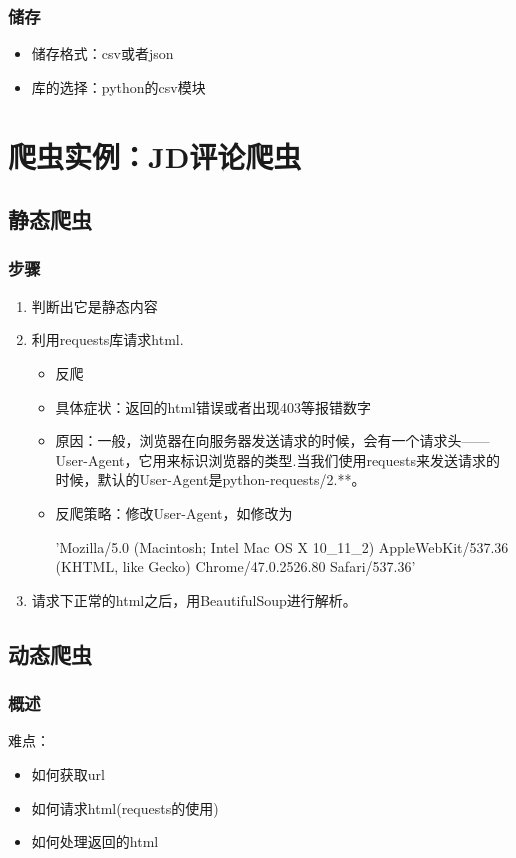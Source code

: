 \documentclass{beamer}
\begin{document}
\begin{frame}
\frametitle{储存}
\begin{itemize}
   \item 储存格式：csv或者json
   \item 库的选择：python的csv模块
\end{itemize}
\end{frame}

\section{爬虫实例：JD评论爬虫}

\subsection{静态爬虫}
\begin{frame}
\frametitle{步骤}
\begin{enumerate}
  \item 判断出它是静态内容
  \item 利用requests库请求html.
  \begin{itemize}
  	\item 反爬
  	\item 具体症状：返回的html错误或者出现403等报错数字
  	\item 原因：一般，浏览器在向服务器发送请求的时候，会有一个请求头——User-Agent，它用来标识浏览器的类型.当我们使用requests来发送请求的时候，默认的User-Agent是python-requests/2.**。
    \item 反爬策略：修改User-Agent，如修改为
    \begin{listings}
    'Mozilla/5.0 (Macintosh; Intel Mac OS X 10\_11\_2) AppleWebKit/537.36 (KHTML, like Gecko) Chrome/47.0.2526.80 Safari/537.36'
    \end{listings}
  \end{itemize}
  \item 请求下正常的html之后，用BeautifulSoup进行解析。
\end{enumerate}
\end{frame}

\subsection{动态爬虫}
\begin{frame}
\frametitle{概述}
难点：
\begin{itemize}
  \item 如何获取url
  \item 如何请求html(requests的使用)
  \item 如何处理返回的html
\end{itemize}
\end{frame}
\end{document}

